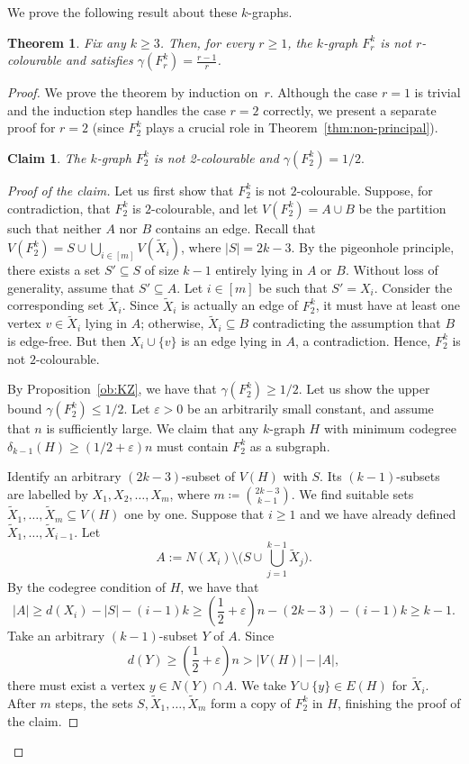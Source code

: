 \documentclass[11pt,a4paper]{article}
\newtheorem{theorem}[definition]{Theorem}
\newtheorem{claim}[definition]{Claim}
\theoremstyle{remark}
\newenvironment{poc}{\begin{proof}[Proof of the claim]\renewcommand*{\qedsymbol}{$\blacksquare$}}{\end{proof}}
\begin{document}
We prove the following result about these $k$-graphs.


\begin{theorem}\label{thm:F_r}
    Fix any $k \ge 3$. Then, for every $r\ge1$, the $k$-graph $F^k_r$ is not $r$-colourable and satisfies $\gamma(F^k_r) = \frac{r-1}{r}$.
\end{theorem}
\begin{proof}
We prove the theorem by induction on~$r$.
Although the case $r=1$ is trivial and the induction step handles the case $r=2$ correctly, we present a separate proof for $r=2$ (since $F_2^k$ plays a crucial role in Theorem~\ref{thm:non-principal}).
\begin{claim}\label{cl:gammaF2}
    The $k$-graph $F^k_2$ is not 2-colourable and $\gamma(F^k_2)=1/2.$
\end{claim}
\begin{poc}
    Let us first show that $F^k_2$ is not $2$-colourable. Suppose, for contradiction, that $F^k_2$ is $2$-colourable, and let $V(F^k_2)=A\cup B$ be the partition such that neither $A$ nor $B$ contains an edge. Recall that $V(F^k_2)= S\cup \bigcup_{i\in [m]}V(\tilde{X}_{i})$, where $|S|=2k-3$. By the pigeonhole principle, there exists a set $S'\subseteq S$ of size $k-1$ entirely lying in $A$ or $B$. Without loss of generality, assume that $S'\subseteq A$. Let $i\in [m]$ be such that $S'=X_i$. Consider the corresponding set $\tilde{X}_{i}$. Since $\tilde{X}_{i}$ is actually an edge of $F^k_2$, it must have at least one vertex $v\in \tilde{X}_{i}$ lying in $A$; otherwise, $\tilde{X}_{i}\subseteq B$ contradicting the assumption that $B$ is edge-free. But then $X_i\cup \{v\}$ is an edge lying in $A$, a contradiction. Hence,  $F^k_2$ is not $2$-colourable.

By Proposition~\ref{ob:KZ}, we have that $\gamma(F^k_2)\ge 1/2$. Let us show the upper bound $\gamma(F^k_2)\le 1/2$. Let $\varepsilon>0$ be an arbitrarily small constant, and assume that $n$ is sufficiently large. We claim that any $k$-graph $H$ with minimum codegree $\delta_{k-1}(H)\ge (1/2+\varepsilon)n$ must contain $F^k_2$ as a subgraph.
        
Identify  an arbitrary $(2k-3)$-subset of $V(H)$ with $S$. Its $(k-1)$-subsets are labelled by $X_1,X_2,\dots,X_m$, where $m\coloneqq \binom{2k-3}{k-1}$. We find suitable sets  $\tilde{X}_1,\dots,\tilde{X}_m\subseteq V(H)$ one by one. Suppose that $i\ge 1$ and we have already defined $\tilde{X}_1,\dots,\tilde{X}_{i-1}$. Let 
\[
A:=N(X_i)\setminus\Big(S\cup \bigcup_{j=1}^{k-1} \tilde{X}_j\Big).
\]By the codegree condition of $H$, we have that
    $$
    |A|\ge d(X_i)-|S|-(i-1)k\ge \left(\frac{1}{2}+\varepsilon\right)n-(2k-3)-(i-1)k\ge %
     k-1.
    $$
    Take an arbitrary $(k-1)$-subset $Y$ of $A$. Since 
    \[
    d(Y)\ge \left(\frac12+\varepsilon\right)n> |V(H)|-|A|,
    \] 
    there must exist a vertex $y\in N(Y)\cap A$. We take $Y\cup \{y\}\in E(H)$ for $\tilde{X}_i$.  After $m$ steps, the sets $S, \tilde{X}_{1},\dots,\tilde{X}_{m}$ form a copy of $F^k_2$ in $H$, finishing the proof of the claim.  
\end{poc}


\end{proof}
\end{document}
